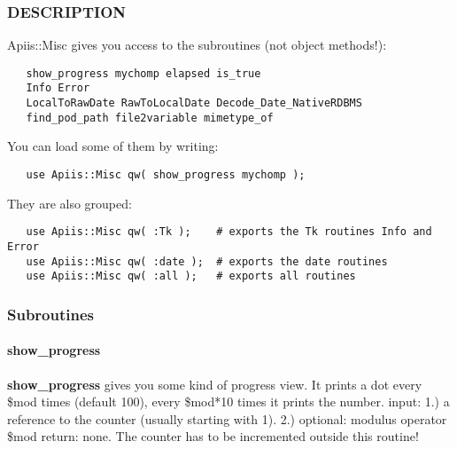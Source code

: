 \subsubsection*{DESCRIPTION\label{Apiis::Misc_--_Provides_some_usefull_subroutines_mainly_for_compatibility_reasons_DESCRIPTION}}


Apiis::Misc gives you access to the subroutines (not object methods!):

\begin{verbatim}
   show_progress mychomp elapsed is_true
   Info Error
   LocalToRawDate RawToLocalDate Decode_Date_NativeRDBMS
   find_pod_path file2variable mimetype_of
\end{verbatim}


You can load some of them by writing:

\begin{verbatim}
   use Apiis::Misc qw( show_progress mychomp );
\end{verbatim}


They are also grouped:

\begin{verbatim}
   use Apiis::Misc qw( :Tk );    # exports the Tk routines Info and Error
   use Apiis::Misc qw( :date );  # exports the date routines
   use Apiis::Misc qw( :all );   # exports all routines
\end{verbatim}
\subsubsection*{Subroutines\label{Apiis::Misc_--_Provides_some_usefull_subroutines_mainly_for_compatibility_reasons_Subroutines}}
\paragraph*{show\_progress\label{Apiis::Misc_--_Provides_some_usefull_subroutines_mainly_for_compatibility_reasons_show_progress}}


\textbf{show\_progress} gives you some kind of progress view. It prints a dot every \$mod
times (default 100), every \$mod*10 times it prints the number.
   input:  1.) a reference to the counter (usually starting with 1).
           2.) optional: modulus operator \$mod
   return: none. The counter has to be incremented outside this routine!

